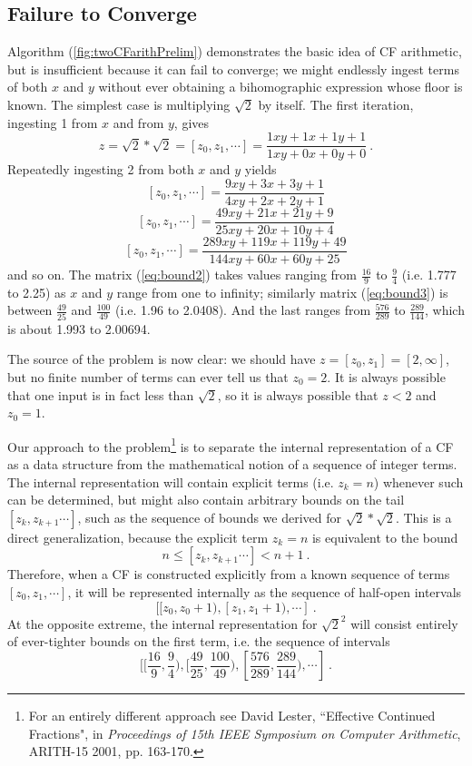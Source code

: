 \documentclass[11pt, oneside]{amsart}   	%
\newcommand{\bihom}[8]{{\frac{#1 xy + #2 x + #3 y + #4}{#5 xy + #6 x + #7 y + #8}}}
\begin{document}
\subsection{Failure to Converge}
Algorithm (\ref{fig:twoCFarithPrelim}) demonstrates the basic idea of CF arithmetic, but is insufficient because it can fail to converge; we might endlessly ingest terms of both $x$ and $y$ without ever obtaining a bihomographic expression whose floor is known. The simplest case is multiplying $\sqrt{2}$ by itself. The first iteration, ingesting 1 from $x$ and from $y$, gives
\begin{equation}\label{eq:bound1}
z = \sqrt{2}*\sqrt{2} = [z_0,z_1, \cdots] = \bihom{1}{1}{1}{1}{1}{0}{0}{0} \ .
\end{equation}
Repeatedly ingesting 2 from both $x$ and $y$ yields
\begin{equation}\label{eq:bound2}
[z_0,z_1, \cdots]  =  \bihom{9}{3}{3}{1}{4}{2}{2}{1}
\end{equation}
\begin{equation}\label{eq:bound3}
[z_0,z_1, \cdots]  =  \bihom{49}{21}{21}{9}{25}{20}{10}{4}
\end{equation}
\begin{equation}\label{eq:bound4}
[z_0,z_1, \cdots]  =  \bihom{289}{119}{119}{49}{144}{60}{60}{25}
\end{equation}
and so on. The matrix (\ref{eq:bound2}) takes values ranging from $\frac{16}{9}$ to $\frac{9}{4}$ (i.e. 1.777 to 2.25) as $x$ and $y$ range from one to infinity;
similarly matrix (\ref{eq:bound3}) is between $\frac{49}{25}$ and $\frac{100}{49}$ (i.e. 1.96 to 2.0408). And the last ranges from $\frac{576}{289}$ to $\frac{289}{144}$, which is about 1.993 to 2.00694.

The source of the problem is now clear: we should have $z=[z_0,z_1]=[2,\infty]$, but no finite number of terms can ever tell us that $z_0=2$. It is always possible that one input is in fact less than $\sqrt{2}$, so it is always possible that $z<2$ and $z_0=1$.

Our approach to the problem\footnote{For an entirely different approach see David Lester, ``Effective Continued Fractions", in \emph{Proceedings of 15th IEEE Symposium on Computer Arithmetic}, ARITH-15 2001, pp. 163-170.} is to separate the internal representation of a CF as a data structure from the mathematical notion of a  sequence of integer terms. The internal representation will contain explicit terms (i.e. $z_k=n$) whenever such can be determined, but might also contain arbitrary bounds on the tail $[z_k, z_{k+1}\cdots]$, such as the  sequence of bounds we derived for $\sqrt{2}*\sqrt{2}$. This is a direct generalization, because the explicit term  $z_k=n$ is equivalent to the bound 
\[
n \leq [z_k, z_{k+1}\cdots] < n+1 \ .
\]
Therefore, when a CF is constructed explicitly from a known sequence of terms $[z_0, z_1, \cdots]$, it will be represented internally as the sequence of half-open intervals
\[
[[z_0, z_0+1),  [z_1, z_1+1), \cdots]\ .
\] 
At the opposite extreme, the internal representation for $\sqrt{2}^2$ will consist entirely of ever-tighter bounds on the first term, i.e. the sequence of intervals
\[
[[\frac{16}{9},\frac{9}{4}), [\frac{49}{25},\frac{100}{49}), [\frac{576}{289},\frac{289}{144}), \cdots]\ .
\] 
\end{document}
